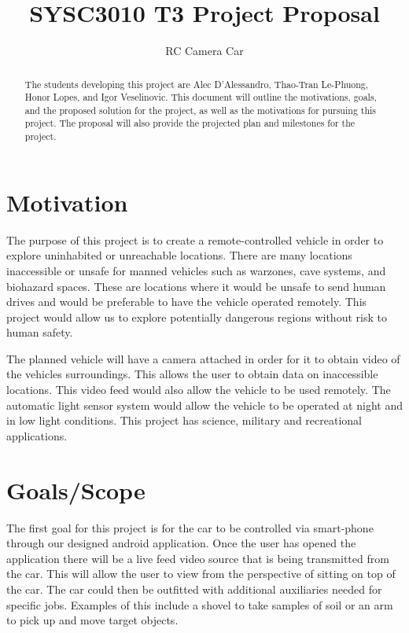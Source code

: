 \documentclass[letterpaper,12pt]{report}
\begin{document}
	\title{SYSC3010 T3 Project Proposal}
	\author{RC Camera Car}
	\date{}
	\maketitle

	\begin{abstract}
		The students developing this project are Alec D'Alessandro, Thao-Tran
		Le-Phuong, Honor Lopes, and Igor Veselinovic. This document will
		outline the motivations, goals, and the proposed solution for the
		project, as well as the motivations for pursuing this project. The
		proposal will also provide the projected plan and milestones for the
		project.
	\end{abstract}

	\tableofcontents

	\pagebreak

	\section*{Motivation}
	\markright{}
	The purpose of this project is to create a remote-controlled vehicle in
	order to explore uninhabited or unreachable locations. There are many
	locations inaccessible or unsafe for manned vehicles such as warzones,
	cave systems, and biohazard spaces. These are locations where it would be
	unsafe to send human drives and would be preferable to have the vehicle
	operated remotely. This project would allow us to explore potentially
	dangerous regions without risk to human safety.

	The planned vehicle will have a camera attached in order for it to obtain
	video of the vehicles surroundings. This allows the user to obtain data on
	inaccessible locations. This video feed would also allow the vehicle to be
	used remotely. The automatic light sensor system would allow the vehicle to
	be operated at night and in low light conditions. This project has science,
	military and recreational applications.

	\section*{Goals/Scope}
	\markright{}
	The first goal for this project is for the car to be controlled via
	smart-phone through our designed android application. Once the user has
	opened the application there will be a live feed video source that is being
	transmitted from the car. This will allow the user to view from the
	perspective of sitting on top of the car. The car could then be outfitted
	with additional auxiliaries needed for specific jobs. Examples of this
	include a shovel to take samples of soil or an arm to pick up and move
	target objects.
\end{document}
